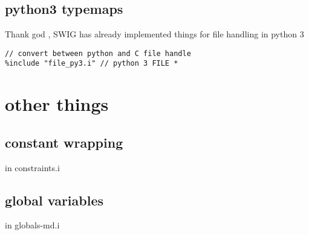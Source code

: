 \documentclass[ twoside,openright,titlepage,numbers=noenddot,headinclude,
                footinclude=true, cleardoublepage=empty,abstractoff, 
                BCOR=5mm,paper=a4,fontsize=11pt,
                ngerman,american,
                ]{scrreprt} %
\begin{document}
\section{python3 typemaps}
Thank god , SWIG has already implemented things for file handling in python 3

\begin{lstlisting}
// convert between python and C file handle
%include "file_py3.i" // python 3 FILE *
\end{lstlisting}


\chapter{other things}

\section{constant wrapping}
in constraints.i
\section{global variables}
in globals-md.i
\end{document}
